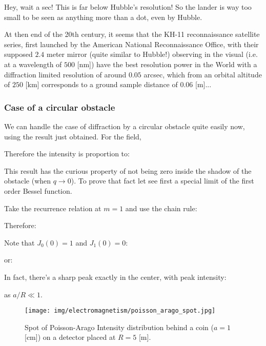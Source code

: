 	Hey, wait a sec! This is far below Hubble's resolution! So the lander is way too small to be seen as anything more than a dot, even by Hubble. 
	\begin{tcolorbox}[title=Remark,colframe=black,arc=10pt]
	At then end of the 20th century, it seems that the KH-11 reconnaissance satellite series, first launched by the American National Reconnaissance Office, with their supposed $2.4$ meter mirror (quite similar to Hubble!) observing in the visual (i.e. at a wavelength of $500$ [nm]) have the best resolution power in the World with a diffraction limited resolution of around $0.05$ arcsec, which from an orbital altitude of $250$ [km] corresponds to a ground sample distance of $0.06$ [m]... 
	\end{tcolorbox}

	\subsubsection{Case of a circular obstacle}\label{fresnel circular obstacle}
	We can handle the case of diffraction by a circular obstacle quite easily now, using the result just obtained. For the field,
	
	Therefore the intensity is proportion to:
	
	This result has the curious property of not being zero inside the shadow of the obstacle (when $q\rightarrow 0$). To prove that fact let see first a special limit of the first order Bessel function.
	
	Take the recurrence relation at $m=1$ and use the chain rule:
	
	Therefore:
	
	Note that $J_{0}(0)=1$ and $J_{1}(0)=0$: 
	
	or:
	
	In fact, there's a sharp peak exactly in the center, with peak intensity:
	
	as $a/R\ll 1$. 
	\begin{figure}[H]
		\centering
		\texttt{[image: img/electromagnetism/poisson\_arago\_spot.jpg]}
		\caption[Spot of Poisson-Arago]{Spot of Poisson-Arago Intensity distribution behind a coin ($a= 1$ [cm]) on a detector placed at $R=5$ [m].}
	\end{figure}

		
	\pagebreak	
